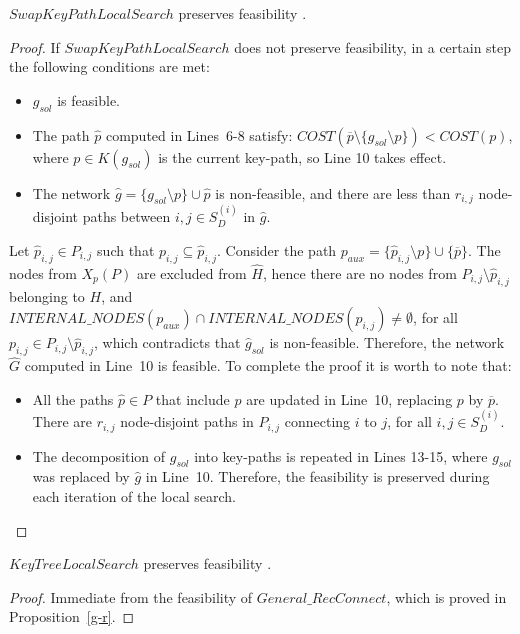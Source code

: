 \begin{proposition}
$SwapKeyPathLocalSearch$ preserves feasibility \cite{11}. 
\end{proposition}
\begin{proof}
If $SwapKeyPathLocalSearch$ does not preserve feasibility, in a certain step the following 
conditions are met:
\begin{itemize}
\item $g_{sol}$ is feasible.
\item The path $\hat{p}$ computed in Lines~6-8 satisfy: 
$COST(\overline{p} \setminus \{g_{sol}\setminus p \}) < COST(p)$, where $p \in K(g_{sol})$ is the current 
key-path, so Line 10 takes effect. 
\item The network $\hat{g} = \{g_{sol} \setminus p \} \cup \hat{p}$ is non-feasible, and 
there are less than $r_{i,j}$ node-disjoint paths between $i,j \in S_{D}^{(i)}$ in $\hat{g}$. 
\end{itemize}

Let $\hat{p}_{i,j} \in P_{i,j}$ such that $p_{i,j} \subseteq \hat{p}_{i,j}$. 
Consider the path $p_{aux}=\{ \hat{p}_{i,j} \setminus p \} \cup \{ \overline{p}\}$. 
The nodes from $X_p(P)$ are excluded from $\hat{H}$, hence there are no nodes 
from $P_{i,j} \setminus \hat{p}_{i,j}$ belonging to $H$, and $INTERNAL\_NODES(p_{aux}) \cap INTERNAL\_NODES(p_{i,j}) \neq  \emptyset$, for all 
$p_{i,j} \in P_{i,j}\setminus \hat{p}_{i,j}$, which contradicts that $\hat{g}_{sol}$ 
is non-feasible. Therefore, the network $\hat{G}$ computed in Line~10 is feasible. To complete the proof it is worth to note that:
\begin{itemize}
\item All the paths $\hat{p} \in P$ that include $p$ are updated in Line~10, 
replacing $p$ by $\overline{p}$. There are $r_{i,j}$ node-disjoint paths in $P_{i,j}$ 
connecting $i$ to $j$, for all $i,j \in S_{D}^{(i)}$.
\item The decomposition of $g_{sol}$ into key-paths is repeated in Lines 13-15, where 
$g_{sol}$ was replaced by $\hat{g}$ in Line~10. Therefore, the feasibility is preserved during each iteration of the local search. 
\end{itemize}
\end{proof}

\begin{proposition}
$KeyTreeLocalSearch$ preserves feasibility \cite{11}. 
\end{proposition}
\begin{proof}
Immediate from the feasibility of $General\_RecConnect$, which is proved in 
Proposition~\ref{g-r}.
\end{proof}

